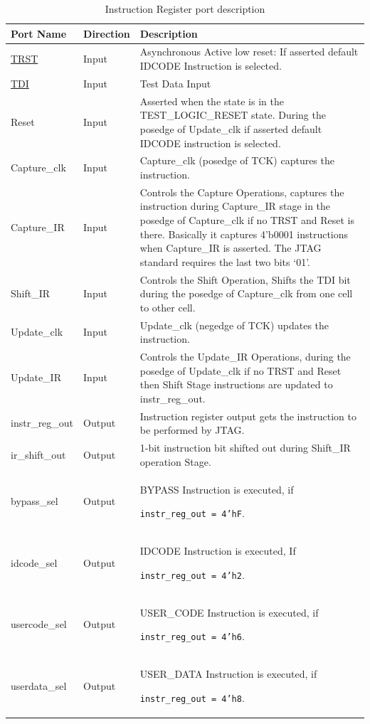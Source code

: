 \begin{longtable}{l l p{9.5cm}}
    \caption{Instruction Register port description}
    \label{tab:instruction-reg-ports}\\
    \hline
         \textbf{Port Name} & \textbf{Direction} & \textbf{Description}\\ \hline \hline
        \hyperref[subsec:trst]{TRST} & Input & Asynchronous Active low reset: If asserted default IDCODE Instruction is selected. \\ \hline
        \hyperref[subsec:tdi]{TDI} & Input & Test Data Input \\ \hline
        Reset & Input & Asserted when the state is in the TEST\_LOGIC\_RESET state. During the posedge of Update\_clk if asserted default IDCODE instruction is selected. \\ \hline
        Capture\_clk & Input & Capture\_clk (posedge of TCK) captures the instruction. \\ \hline
        Capture\_IR & Input & Controls the Capture Operations, captures the instruction during Capture\_IR stage in the posedge of Capture\_clk if no TRST and Reset is there. Basically it captures 4’b0001 instructions when Capture\_IR is asserted. The JTAG standard requires the last two bits ‘01’. \\ \hline
        Shift\_IR & Input & Controls the Shift Operation, Shifts the TDI bit during the posedge of Capture\_clk from one cell to other cell. \\ \hline
        Update\_clk & Input & Update\_clk (negedge of TCK) updates the instruction. \\ \hline
        Update\_IR & Input & Controls the Update\_IR Operations, during the posedge of Update\_clk if no TRST and Reset then Shift Stage instructions are updated to instr\_reg\_out. \\ \hline
        instr\_reg\_out & Output & Instruction register output gets the instruction to be performed by JTAG. \\ \hline
        ir\_shift\_out & Output & 1-bit instruction bit shifted out during Shift\_IR operation Stage. \\ \hline
        bypass\_sel & Output & BYPASS Instruction is executed, if
        
        \texttt{instr\_reg\_out = 4’hF}. \\ \hline
        idcode\_sel & Output & IDCODE Instruction is executed, If
        
        \texttt{instr\_reg\_out = 4’h2}. \\ \hline
        usercode\_sel & Output & USER\_CODE Instruction is executed, if
        
        \texttt{instr\_reg\_out = 4’h6}. \\ \hline
        userdata\_sel & Output & USER\_DATA Instruction is executed, if
        
        \texttt{instr\_reg\_out = 4’h8}. \\ \hline
\end{longtable}

